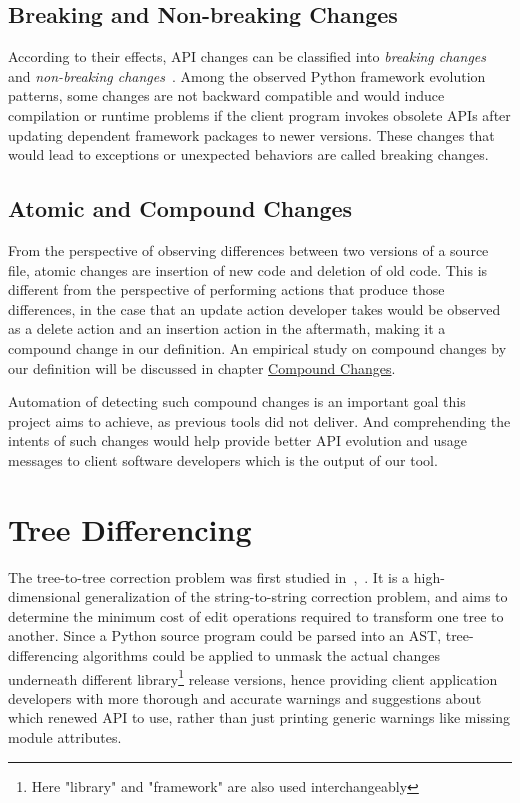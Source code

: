 \subsection{Breaking and Non-breaking Changes}

According to their effects, API changes can be classified into \textit{breaking changes} and \textit{non-breaking changes}~\cite{api-evo-refactoring}. Among the observed Python framework evolution patterns, some changes are not backward compatible and would induce compilation or runtime problems if the client program invokes obsolete APIs after updating dependent framework packages to newer versions. These changes that would lead to exceptions or unexpected behaviors are called breaking changes.

\subsection{Atomic and Compound Changes}

From the perspective of observing differences between two versions of a source file, atomic changes are insertion of new code and deletion of old code. This is different from the perspective of performing actions that produce those differences, in the case that an update action developer takes would be observed as a delete action and an insertion action in the aftermath, making it a compound change in our definition. An empirical study on compound changes by our definition will be discussed in chapter \hyperref[chap:compound-changes]{Compound Changes}.

Automation of detecting such compound changes is an important goal this project aims to achieve, as previous tools did not deliver. And comprehending the intents of such changes would help provide better API evolution and usage messages to client software developers which is the output of our tool.

\section{Tree Differencing}

The tree-to-tree correction problem was first studied in~\cite{tree-edit-p},~\cite{tree-correction-p}. It is a high-dimensional generalization of the string-to-string correction problem, and aims to determine the minimum cost of edit operations required to transform one tree to another. Since a Python source program could be parsed into an AST, tree-differencing algorithms could be applied to unmask the actual changes underneath different library\footnote{Here "library" and "framework" are also used interchangeably} release versions, hence providing client application developers with more thorough and accurate warnings and suggestions about which renewed API to use, rather than just printing generic warnings like missing module attributes.

